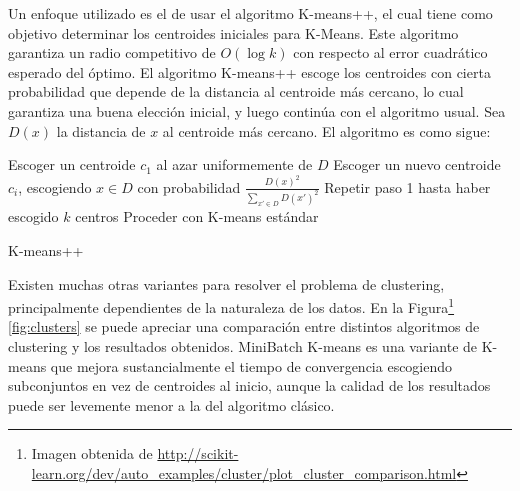     Un enfoque utilizado es el de usar el algoritmo
    K-means++\cite{Arthur:2007:KAC:1283383.1283494}, el cual tiene
    como objetivo determinar los centroides iniciales para
    K-Means. Este algoritmo garantiza un radio competitivo de
    $O(\log k)$ con respecto al error cuadrático esperado del óptimo.
    El algoritmo K-means++ escoge los centroides con cierta
    probabilidad que depende de la distancia al centroide más cercano,
    lo cual garantiza una buena elección inicial, y luego continúa con
    el algoritmo usual. Sea $D(x)$ la distancia de $x$ al centroide
    más cercano. El algoritmo es como sigue:

\begin{algorithm}[H]
Escoger un centroide $c_1$ al azar uniformemente de $D$\;
Escoger un nuevo centroide $c_i$, escogiendo $x \in D$ con probabilidad $\frac{D(x)^2}{\sum_{x' \in D}D(x')^2}$\;
Repetir paso 1 hasta haber escogido $k$ centros\;
Proceder con K-means estándar\;
 \caption{K-means++}
\end{algorithm}


    Existen muchas otras variantes para resolver el problema de
    clustering, principalmente dependientes de la naturaleza de los
    datos. En la Figura\footnote{Imagen obtenida de \href{http://scikit-learn.org/dev/auto\_examples/cluster/plot\_cluster\_comparison.html}{http://scikit-learn.org/dev/auto\_examples/cluster/plot\_cluster\_comparison.html} }
     \ref{fig:clusters} se puede apreciar una
    comparación entre distintos algoritmos de clustering y los
    resultados obtenidos. MiniBatch K-means es una variante de K-means
    que mejora sustancialmente el tiempo de convergencia escogiendo
    subconjuntos en vez de centroides al inicio, aunque la calidad de
    los resultados puede ser levemente menor a la del algoritmo
    clásico\cite{Sculley:2010:WKC:1772690.1772862}.

